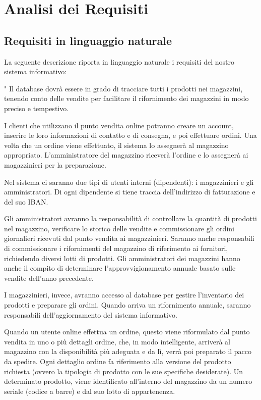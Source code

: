 \section{Analisi dei Requisiti}

\subsection{Requisiti in linguaggio naturale}

La seguente descrizione riporta in linguaggio naturale i requisiti del nostro sistema informativo:

"
Il database dovrà essere in grado di tracciare tutti i prodotti nei magazzini, tenendo conto delle vendite per facilitare il rifornimento dei magazzini in modo preciso e tempestivo.

I clienti che utilizzano il punto vendita online potranno creare un account, inserire le loro informazioni di contatto e di consegna, e poi effettuare ordini. Una volta che un ordine viene effettuato, il sistema lo assegnerà al magazzino appropriato. L'amministratore del magazzino riceverà l'ordine e lo assegnerà ai magazzinieri per la preparazione. 

Nel sistema ci saranno due tipi di utenti interni (dipendenti): i magazzinieri e gli amministratori.
Di ogni dipendente si tiene traccia dell'indirizzo di fatturazione e del suo IBAN.


Gli amministratori avranno la responsabilità di controllare la quantità di prodotti nel magazzino, verificare lo storico delle vendite e commissionare gli ordini giornalieri ricevuti dal punto vendita ai magazzinieri. Saranno anche responsabili di commissionare i rifornimenti del magazzino di riferimento ai fornitori, richiedendo diversi lotti di prodotti.
Gli amministratori dei magazzini hanno anche il compito di determinare l'approvvigionamento annuale basato sulle vendite dell'anno precedente.

I magazzinieri, invece, avranno accesso al database per gestire l'inventario dei prodotti e preparare gli ordini. 
Quando arriva un rifornimento annuale, saranno responsabili dell'aggiornamento del sistema informativo.

Quando un utente online effettua un ordine, questo viene riformulato dal punto vendita in uno o più dettagli ordine, che, in modo intelligente, arriverà al magazzino con la disponibilità più adeguata e da lì, verrà poi preparato il pacco da spedire.
Ogni dettaglio ordine fa riferimento alla versione del prodotto richiesta (ovvero la tipologia di prodotto con le sue specifiche desiderate).
Un determinato prodotto, viene identificato all'interno del magazzino da un numero seriale (codice a barre) e dal suo lotto di appartenenza.

